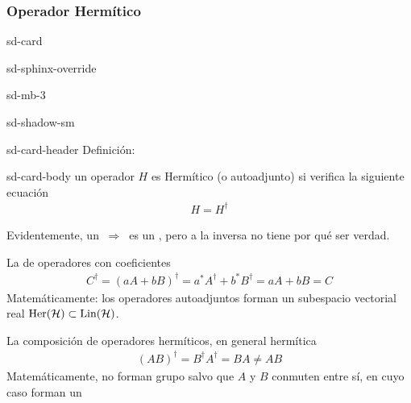 \documentclass[letterpaper,10pt,english]{jupyterBook}
\newcommand{\Hil}{{\cal H}}
\newcommand{\Lin}{\hbox{Lin}}
\begin{document}
\subsubsection{Operador Hermítico}
\label{\detokenize{docs/Part_01_Formalismo/Chapter_01_02_Formalismo_matem_xe1tico/01_03_Operadores_myst:operador-hermitico}}
\sphinxAtStartPar


\begin{sphinxuseclass}{sd-card}
\begin{sphinxuseclass}{sd-sphinx-override}
\begin{sphinxuseclass}{sd-mb-3}
\begin{sphinxuseclass}{sd-shadow-sm}
\begin{sphinxuseclass}{sd-card-header}
\sphinxAtStartPar
Definición:

\end{sphinxuseclass}
\begin{sphinxuseclass}{sd-card-body}
\sphinxAtStartPar
un operador  \(H\) es Hermítico (o autoadjunto)  si  verifica la siguiente ecuación
\begin{equation*}
\begin{split}
H = H^\dagger 
\end{split}
\end{equation*}
\end{sphinxuseclass}
\end{sphinxuseclass}
\end{sphinxuseclass}
\end{sphinxuseclass}
\end{sphinxuseclass}
\sphinxAtStartPar
Evidentemente, un  \(~\Rightarrow ~\) es un , pero a la inversa no tiene por qué ser verdad.

\sphinxAtStartPar
La  de operadores   con coeficientes    
\begin{equation*}
\begin{split}
C^\dagger = (a A + b B)^\dagger = a^* A^\dagger + b^* B^\dagger = aA + b B = C
\end{split}
\end{equation*}
\sphinxAtStartPar
Matemáticamente: los operadores autoadjuntos forman un subespacio vectorial real \(\hbox{Her}(\Hil) \subset \Lin(\Hil)\).

\sphinxAtStartPar
La composición de operadores hermíticos, en general  hermítica
\begin{equation*}
\begin{split}
(A B)^\dagger = B^\dagger A^\dagger = BA \neq AB
\end{split}
\end{equation*}
\sphinxAtStartPar
Matemáticamente, no forman grupo salvo que \(A\) y \(B\) conmuten entre sí, en cuyo caso forman un 
\end{document}

